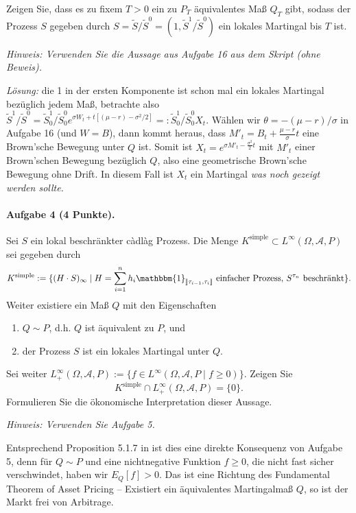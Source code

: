 \documentclass{article}
\begin{document}
Zeigen Sie, dass es zu fixem $T>0$ ein zu $P_T$ äquivalentes Maß $Q_T$ gibt, sodass der Prozess $S$ gegeben durch $S=\tilde{S}/\tilde{S}^0=(1,\tilde{S}^1/\tilde{S}^0)$ ein lokales Martingal bis $T$ ist.

\noindent\emph{Hinweis: Verwenden Sie die Aussage aus Aufgabe 16 aus dem Skript (ohne Beweis).}

\noindent\emph{Lösung:} die 1 in der ersten Komponente ist schon mal ein lokales Martingal bezüglich jedem Maß, betrachte also $\tilde{S}^1/\tilde{S}^0=\tilde{S}^1_0/\tilde{S}^0_0e^{\sigma W_t+t[(\mu-r)-\sigma^2/2]}=:\tilde{S}^1_0/\tilde{S}^0_0 X_t$.
Wählen wir $\theta=-(\mu-r)/\sigma$ in Aufgabe 16 (und $W=B$), dann kommt heraus, dass $M'_t=B_t+\frac{\mu-r}{\sigma}t$ eine Brown'sche Bewegung unter $Q$ ist.
Somit ist $X_t=e^{\sigma M'_t-\frac{\sigma^2}{2}t}$ mit $M'_t$ einer Brown'schen Bewegung bezüglich $Q$, also eine geometrische Brown'sche Bewegung ohne Drift.
In diesem Fall ist $X_t$ ein Martingal \emph{was noch gezeigt werden sollte.}

\paragraph{Aufgabe 4 \textnormal{(4 Punkte)}.}
Sei $S$ ein lokal beschränkter càdlàg Prozess.
Die Menge $K^\text{simple}\subset L^\infty(\Omega,\mathscr{A},P)$ sei gegeben durch
\[
  K^\text{simple}:=\{(H\cdot S)_\infty\mid H=\sum_{i=1}^n h_i\mathbbm{1}_{\rrbracket\tau_{i-1},\tau_i\rrbracket}\text{ einfacher Prozess, $S^{\tau_n}$ beschränkt}\}.
\]
Weiter existiere ein Maß $Q$ mit den Eigenschaften
\begin{enumerate}
\item $Q\sim P$, d.h. $Q$ ist äquivalent zu $P$, und
\item der Prozess $S$ ist ein lokales Martingal unter $Q$.
\end{enumerate}
Sei weiter $L_+^\infty(\Omega,\mathscr{A},P):=\{f\in L^\infty(\Omega,\mathscr{A},P\mid f\geq0)\}$.
Zeigen Sie
\[
K^\text{simple}\cap L^\infty_+(\Omega,\mathscr{A},P)=\{0\}.
\]
Formulieren Sie die ökonomische Interpretation dieser Aussage.

\noindent\emph{Hinweis: Verwenden Sie Aufgabe 5.}

Entsprechend Proposition 5.1.7 in \cite{Delbaen2006} ist dies eine direkte Konsequenz von Aufgabe 5, denn für $Q\sim P$ und eine nichtnegative Funktion $f\geq0$, die nicht fast sicher verschwindet, haben wir $E_Q[f]>0$.
Das ist eine Richtung des Fundamental Theorem of Asset Pricing -- Existiert ein äquivalentes Martingalmaß $Q$, so ist der Markt frei von Arbitrage.
\end{document}
